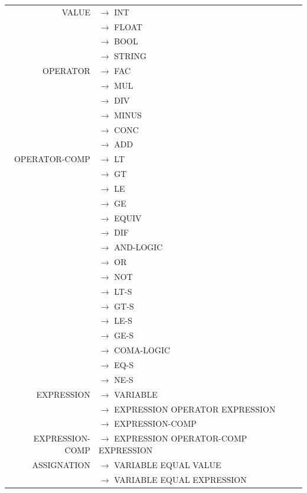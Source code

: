 \documentclass[a4paper,10pt]{article}
\begin{document}
\begin{center}

\begin{longtable}{rl}

VALUE				& $\rightarrow$ INT \\
					& $\rightarrow$ FLOAT \\
					& $\rightarrow$ BOOL \\
					& $\rightarrow$ STRING \\
OPERATOR			& $\rightarrow$ FAC	\\ 
					& $\rightarrow$ MUL \\ 
					& $\rightarrow$ DIV \\ 
					& $\rightarrow$ MINUS \\ 
					& $\rightarrow$ CONC \\ 
					& $\rightarrow$ ADD	\\ 
OPERATOR-COMP		& $\rightarrow$ LT\\
					& $\rightarrow$ GT	\\
					& $\rightarrow$ LE	\\
					& $\rightarrow$ GE	\\
					& $\rightarrow$ EQUIV	\\
					& $\rightarrow$ DIF	\\
					& $\rightarrow$ AND-LOGIC	\\
					& $\rightarrow$ OR		\\
					& $\rightarrow$ NOT\\
					& $\rightarrow$ LT-S\\
					& $\rightarrow$ GT-S\\
					& $\rightarrow$ LE-S	\\
					& $\rightarrow$ GE-S	\\
					& $\rightarrow$ COMA-LOGIC	\\
					& $\rightarrow$ EQ-S	\\
					& $\rightarrow$ NE-S	\\
EXPRESSION			& $\rightarrow$ VARIABLE   \\
					& $\rightarrow$ EXPRESSION OPERATOR EXPRESSION \\ 
					& $\rightarrow$ EXPRESSION-COMP \\
EXPRESSION-COMP		& $\rightarrow$ EXPRESSION OPERATOR-COMP EXPRESSION \\
ASSIGNATION			& $\rightarrow$ VARIABLE EQUAL VALUE \\
					& $\rightarrow$ VARIABLE EQUAL EXPRESSION \\
					

\end{longtable}
\end{center}
\end{document}
